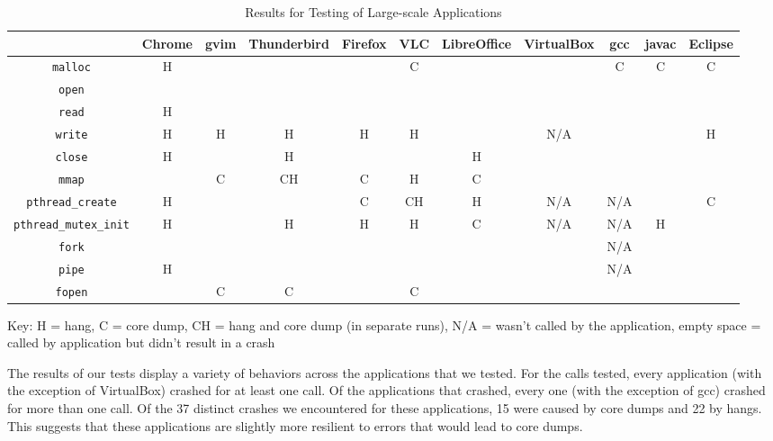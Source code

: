 \begin{table}
\centering
\caption{Results for Testing of Large-scale Applications}
		\begin{adjustbox}{width=\textwidth}
		\begin{tabular}{|c|c|c|c|c|c|c|c|c|c|c|}
			\hline
			& Chrome & gvim & Thunderbird & Firefox & VLC & LibreOffice & VirtualBox & gcc & javac & Eclipse\\
			\hline
			\texttt{malloc} & H & & & & C &  & & C & C & C \\ \hline
			\texttt{open} & & & & & & & & & & \\ \hline
			\texttt{read} & H & & & & & & & & & \\ \hline
			\texttt{write} & H & H & H & H & H & & N/A& & & H \\ \hline
			\texttt{close} & H & & H & & & H & & & & \\ \hline
			\texttt{mmap} & & C & CH & C & H & C & & & &\\ \hline
			\texttt{pthread\_create}& H & &  & C & CH & H & N/A& N/A& & C \\ \hline
			\texttt{pthread\_mutex\_init} & H & & H & H & H & C & N/A& N/A & H &  \\ \hline
			\texttt{fork} & & & & & & & & N/A & & \\ \hline
			\texttt{pipe} & H & & & & & &  & N/A & &\\ \hline
			\texttt{fopen} & & C & C & & C & & & & & \\ \hline
		\end{tabular} 
		\end{adjustbox}
		Key: H = hang, C = core dump, CH = hang and core dump (in separate runs), N/A = wasn't called by the application, empty space = called by application but didn't result in a crash 
\end{table}

The results of our tests display a variety of behaviors across the applications that we tested. For the calls tested, every application (with the exception of VirtualBox) crashed for at least one call. Of the applications that crashed, every one (with the exception of gcc) crashed for more than one call. Of the 37 distinct crashes we encountered for these applications, 15 were caused by core dumps and 22 by hangs. This suggests that these applications are slightly more resilient to errors that would lead to core dumps. 

